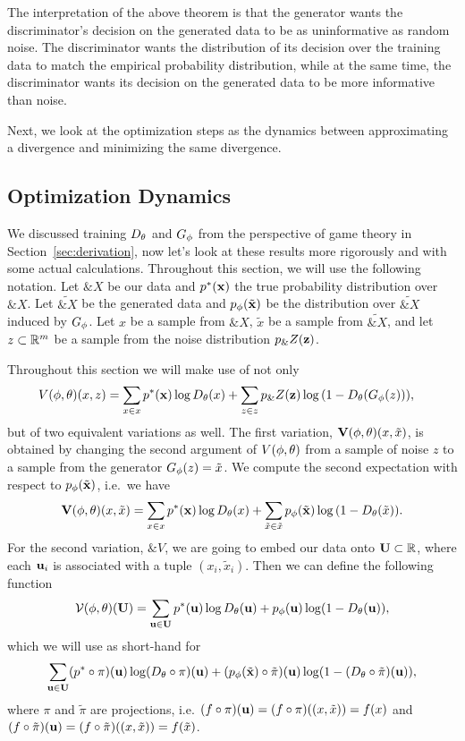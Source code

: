 The interpretation of the above theorem is that the generator wants
the discriminator's decision on the generated data to be as
uninformative as random noise.  The discriminator wants the
distribution of its decision over the training data to match the
empirical probability distribution, while at the same time, the
discriminator wants its decision on the generated data to be more
informative than noise.

Next, we look at the optimization steps as the dynamics between
approximating a divergence and minimizing the same divergence.

\subsection{Optimization Dynamics}%
\label{sec:optimization-dynamics}

We discussed training $D_\theta$ and $G_\phi$ from the perspective of game
theory in Section~\ref{sec:derivation}, now let's look at these
results more rigorously and with some actual calculations. Throughout
this section, we will use the following notation. Let $\&X$ be our
data and $p^*(\mathbf{x})$ the true probability distribution over $\&X$. Let
$\tilde{\&X}$ be the generated data and $p_{\phi}(\tilde{\mathbf{x}})$ be the distribution over
$\tilde{\&X}$ induced by $G_\phi$. Let $x$ be a sample from $\&X$,
$\tilde{x}$ be a sample from $\tilde{\&X}$, and let
$z \subset \mathbb{R}^m$ be a sample from the noise distribution $p_\&Z(\mathbf{z})$.

Throughout this section we will make use of not only
\begin{align} V(\phi, \theta)(x, z) & = \sum_{x \in x}p^*(\mathbf{x})\log{D_\theta(x)} +
  \sum_{z \in z}p_\&Z(\mathbf{z})\log{(1 - D_\theta(G_\phi(z)))},
\end{align}
but of two equivalent variations as well. The first variation,
$\mathbf{V}(\phi, \theta)(x, \tilde{x})$, is obtained by changing the
second argument of $V(\phi, \theta)$ from a sample of noise $z$ to a sample from
the generator $G_\phi(z) = \tilde{x}$. We compute the second
expectation with respect to $p_{\phi}(\tilde{\mathbf{x}})$, i.e.\ we have
\begin{align}
  \mathbf{V}(\phi, \theta)(x, \tilde{x}) = \sum_{x \in x}p^*(\mathbf{x})\log{D_\theta(x)} + \sum_{\tilde{x} \in\tilde{x}}p_{\phi}(\tilde{\mathbf{x}})\log{(1 - D_\theta(\tilde{x}))}.
\end{align}
For the second variation, $\&V$, we are going to embed our data onto $\mathbf{U}
\subset \mathbb{R}$, where each $\mathbf{u}_i$ is associated with a tuple $(x_i,
\tilde{x}_i)$. Then we can define the following function
\begin{align}
  \label{eq:joined}
  \mathcal{V}(\phi, \theta)(\mathbf{U}) = \sum_{\mathbf{u} \in \mathbf{U}} p^*(\mathbf{u}) \log D_\theta(\mathbf{u}) + p_{\phi}(\mathbf{u}) \log(1 - D_\theta(\mathbf{u})),
\end{align}
which we will use as short-hand for
\begin{align}
  \label{eq:joined-verbose}
  \sum_{\mathbf{u} \in \mathbf{U}} (p^* \circ \pi)(\mathbf{u})\log (D_\theta \circ \pi)(\mathbf{u}) + (p_{\phi}(\tilde{\mathbf{x}}) \circ \tilde{\pi})(\mathbf{u}) \log(1 - (D_\theta \circ \tilde{\pi})(\mathbf{u})),
\end{align}
where $\pi$ and $\tilde{\pi}$ are projections, i.e. $(f \circ \pi)(\mathbf{u}) = (f
\circ \pi)((x, \tilde{x})) = f(x)$ and $(f \circ \tilde{\pi})(\mathbf{u}) = (f
\circ \tilde{\pi})((x, \tilde{x})) = f(\tilde{x})$.

